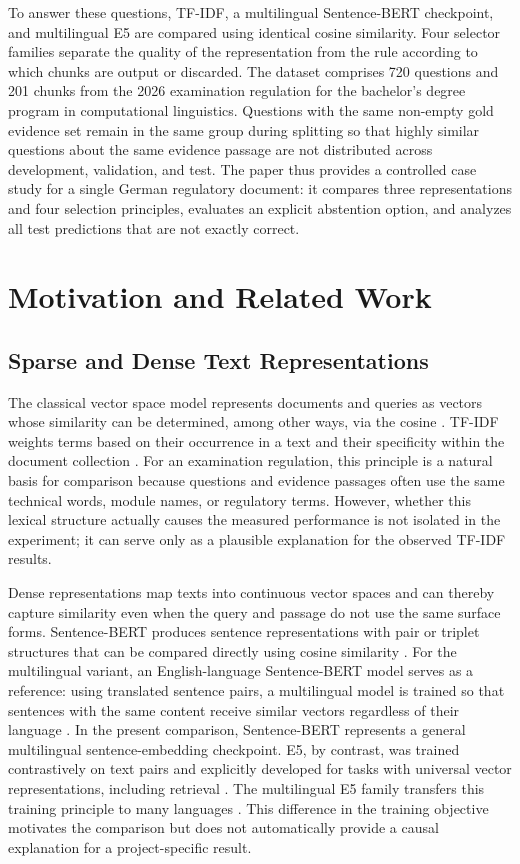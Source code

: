 \documentclass[11pt]{article}
\begin{document}
To answer these questions, TF-IDF, a multilingual Sentence-BERT checkpoint, and multilingual E5 are compared using identical cosine similarity. Four selector families separate the quality of the representation from the rule according to which chunks are output or discarded. The dataset comprises 720 questions and 201 chunks from the 2026 examination regulation for the bachelor's degree program in computational linguistics. Questions with the same non-empty gold evidence set remain in the same group during splitting so that highly similar questions about the same evidence passage are not distributed across development, validation, and test. The paper thus provides a controlled case study for a single German regulatory document: it compares three representations and four selection principles, evaluates an explicit abstention option, and analyzes all test predictions that are not exactly correct.


\section{Motivation and Related Work}

\subsection{Sparse and Dense Text Representations}

The classical vector space model represents documents and queries as vectors whose similarity can be determined, among other ways, via the cosine \citep{salton1975vector}. TF-IDF weights terms based on their occurrence in a text and their specificity within the document collection \citep{sparckjones1972statistical}. For an examination regulation, this principle is a natural basis for comparison because questions and evidence passages often use the same technical words, module names, or regulatory terms. However, whether this lexical structure actually causes the measured performance is not isolated in the experiment; it can serve only as a plausible explanation for the observed TF-IDF results.

Dense representations map texts into continuous vector spaces and can thereby capture similarity even when the query and passage do not use the same surface forms. Sentence-BERT produces sentence representations with pair or triplet structures that can be compared directly using cosine similarity \citep{reimers-gurevych-2019-sentence}. For the multilingual variant, an English-language Sentence-BERT model serves as a reference: using translated sentence pairs, a multilingual model is trained so that sentences with the same content receive similar vectors regardless of their language \citep{reimers-gurevych-2020-making}. In the present comparison, Sentence-BERT represents a general multilingual sentence-embedding checkpoint. E5, by contrast, was trained contrastively on text pairs and explicitly developed for tasks with universal vector representations, including retrieval \citep{wang2022text}. The multilingual E5 family transfers this training principle to many languages \citep{wang2024multilingual}. This difference in the training objective motivates the comparison but does not automatically provide a causal explanation for a project-specific result.
\end{document}
